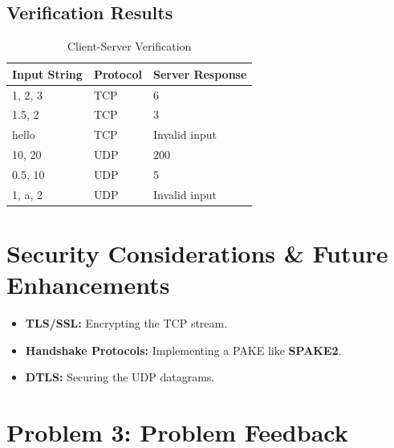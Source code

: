 \documentclass[11pt]{article}
\begin{document}
\subsection{Verification Results}
\begin{table}[h]
\centering
\color{darkfg}
\caption{Client-Server Verification}
\vspace{0.1in}
\begin{tabular}{lll}
\toprule
Input String & Protocol & Server Response \\
\midrule
1, 2, 3 & TCP & 6 \\
1.5, 2 & TCP & 3 \\
hello & TCP & Invalid input \\
10, 20 & UDP & 200 \\
0.5, 10 & UDP & 5 \\
1, a, 2 & UDP & Invalid input \\
\bottomrule
\end{tabular}
\end{table}

\section{Security Considerations \& Future Enhancements}
\begin{itemize}
    \item \textbf{TLS/SSL:} Encrypting the TCP stream.
    \item \textbf{Handshake Protocols:} Implementing a PAKE like \textbf{SPAKE2}.
    \item \textbf{DTLS:} Securing the UDP datagrams.
\end{itemize}

\section{Problem 3: Problem Feedback}
\end{document}
